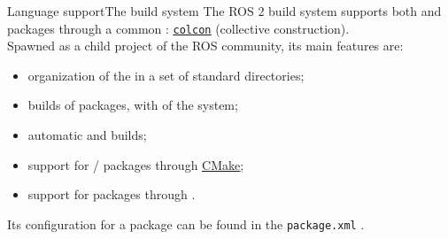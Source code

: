 \begin{frame}{Language support}{The build system}
  The ROS 2 build system supports both  and  packages through a common : \href{https://colcon.readthedocs.io/en/released/}{\color{blue}\underline{\texttt{colcon}}} (collective construction).\\
  \bigskip
  Spawned as a child project of the ROS community, its main features are:
  \begin{itemize}
    \item organization of the  in a set of standard directories;
    \item {} builds of packages, with  of the system;
    \item automatic  and  builds;
    \item support for / packages through \href{https://cmake.org/}{\color{blue}\underline{CMake}};
    \item support for  packages through \href{https://setuptools.pypa.io/en/latest/}{}.
  \end{itemize}
  Its configuration for a package can be found in the \texttt{package.xml} .
\end{frame}
